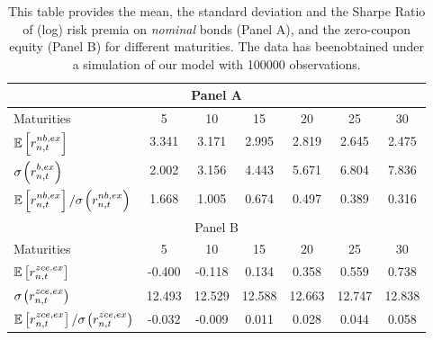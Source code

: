 \begin{table}[h!] \small
\captionsetup{font=small, width=0.8\textwidth}
\caption{This table provides the mean, the standard deviation and the Sharpe Ratio of (log) risk premia on \emph{nominal} bonds (Panel A), and the zero-coupon equity (Panel B) for different maturities. The data has beenobtained under a simulation of our model with 100000 observations.} \label{tab:tab50} \vspace{0.25cm}
\centering
\def\arraystretch{1.1}
\begin{tabular}{l|cccccc}
\hline\hline
\multicolumn{7}{c}{Panel A} \\\hline\hline
Maturities&5 &10 &15 &20 &25 &30 \\
\hline
$\mathbb{E}\left[r_{n,t}^{nb,ex}\right]$&3.341 &3.171 &2.995 &2.819 &2.645 &2.475 \\
$\sigma\hspace{-0.02cm}\left(r_{n,t}^{b,ex}\right)$&2.002 &3.156 &4.443 &5.671 &6.804 &7.836 \\
$\E\left[r_{n,t}^{nb,ex}\right]/\sigma\hspace{-0.02cm}\left(r_{n,t}^{nb,ex}\right)$&1.668 &1.005 &0.674 &0.497 &0.389 &0.316 \\
\hline\hline
\multicolumn{7}{c}{Panel B} \\\hline\hline
Maturities&5 &10 &15 &20 &25 &30 \\
\hline
$\mathbb{E}\left[r_{n,t}^{zce,ex}\right]$&-0.400 &-0.118 &0.134 &0.358 &0.559 &0.738 \\
$\sigma\hspace{-0.02cm}\left(r_{n,t}^{zce,ex}\right)$&12.493 &12.529 &12.588 &12.663 &12.747 &12.838 \\
$\E\left[r_{n,t}^{zce,ex}\right]/\sigma\hspace{-0.02cm}\left(r_{n,t}^{zce,ex}\right)$&-0.032 &-0.009 &0.011 &0.028 &0.044 &0.058 \\
\hline
\hline
\end{tabular}
\end{table}
